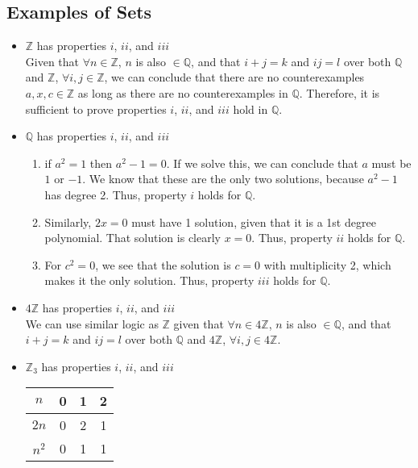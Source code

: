 \documentclass{article}
\begin{document}
  \subsection{Examples of Sets}
  \begin{itemize}
  \item $\mathbb{Z}$ has properties $i$, $ii$, and $iii$\\
    Given that $\forall n \in \mathbb{Z}$, $n$ is also $\in \mathbb{Q}$, and that $i+j=k$ and $ij=l$ over both $\mathbb{Q}$ and $\mathbb{Z}$, $\forall i, j \in \mathbb{Z}$, we can conclude that there are no counterexamples $a, x, c \in \mathbb{Z}$ as long as there are no counterexamples in $\mathbb{Q}$. Therefore, it is sufficient to prove properties $i$, $ii$, and $iii$ hold in $\mathbb{Q}$. 
  \item $\mathbb{Q}$ has properties $i$, $ii$, and $iii$
    \begin{enumerate}
    \item if $a^2 = 1$ then $a^2-1 = 0$. If we solve this, we can conclude that $a$ must be $1$ or $-1$. We know that these are the only two solutions, because $a^2-1$ has degree 2. Thus, property $i$ holds for $\mathbb{Q}$.
    \item Similarly, $2x = 0$ must have 1 solution, given that it is a 1st degree polynomial. That solution is clearly $x = 0$. Thus, property $ii$ holds for $\mathbb{Q}$.
    \item For $c^2=0$, we see that the solution is $c=0$ with multiplicity 2, which makes it the only solution. Thus, property $iii$ holds for $\mathbb{Q}$.
    \end{enumerate}
  \item $4\mathbb{Z}$ has properties $i$, $ii$, and $iii$\\
    We can use similar logic as $\mathbb{Z}$ given that $\forall n \in 4\mathbb{Z}$, $n$ is also $\in \mathbb{Q}$, and that $i+j=k$ and $ij=l$ over both $\mathbb{Q}$ and $4\mathbb{Z}$, $\forall i, j \in 4\mathbb{Z}$.
  \item $\mathbb{Z}_3$ has properties $i$, $ii$, and $iii$\\
    \begin{tabular} {|c|c|c|c|}
      \hline $n$   & 0 & 1 & 2\\
      \hline $2n$  & 0 & 2 & 1\\
      \hline $n^2$ & 0 & 1 & 1\\                       
      \hline 
    \end{tabular}\\

\end{itemize}
\end{document}
